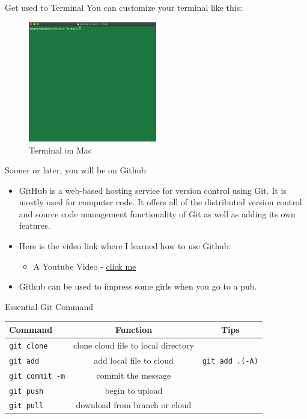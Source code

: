 \documentclass[handout]{beamer} %
\begin{document}
\begin{frame}{Get used to Terminal}
	You can customize your terminal like this:
	\begin{figure}[H]
		\centering
		\includegraphics[width = 0.5\textwidth]{Pictures/terminal2}
		\caption{Terminal on Mac}
	\end{figure}
\end{frame}

\begin{frame}{Sooner or later, you will be on Github}
\begin{itemize}
\setlength\itemsep{1em} 
	\item GitHub is a web-based hosting service for version control using Git. It is mostly used for computer code. It offers all of the distributed version control and source code management functionality of Git as well as adding its own features.
	\item Here is the video link where I learned how to use Github: \begin{itemize} 
	\item A Youtube Video - \href{https://www.youtube.com/watch?v=0fKg7e37bQE&fbclid=IwAR3qiy3lyLxkwiE_6recElswiRJsknhFnnhjK5M4OMNkzBbI2aco01fJBOo}{click me \Coffeecup }
	\end{itemize}
	\item Github can be used to impress some girls when you go to a pub. 
\end{itemize}
\end{frame}

\begin{frame}{Essential Git Command}
\begin{table}[H]
	\centering
	\begin{tabular}{lcc}
	\hline 
	\hline 
		Command & Function & Tips \\
		\hline 
		\texttt{git clone} & clone cloud file to local directory & \\
		\texttt{git add} & add local file to cloud & \texttt{git add .(-A)} \\
		\texttt{git commit -m} & commit the message & \\
		\texttt{git push} & begin to upload & \\
		\texttt{git pull} & download from branch or cloud & \\
		\hline  
	\end{tabular}
\end{table}
	
\end{frame}
\end{document}
